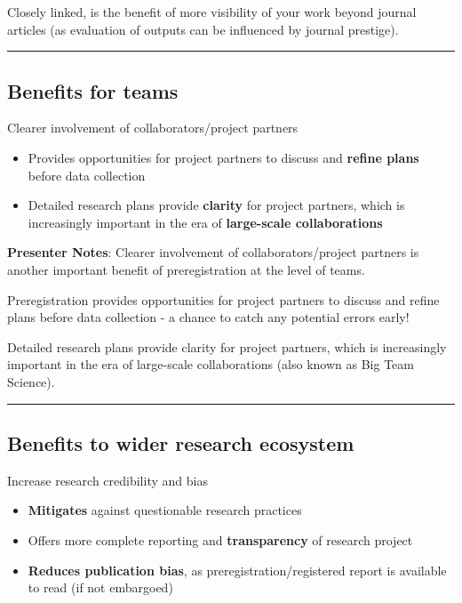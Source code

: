 \documentclass[
  letterpaper,
  DIV=11,
  numbers=noendperiod]{scrartcl}
\providecommand{\tightlist}{%
  \setlength{\itemsep}{0pt}\setlength{\parskip}{0pt}}
\begin{document}
Closely linked, is the benefit of more visibility of your work beyond
journal articles (as evaluation of outputs can be influenced by journal
prestige).

\begin{center}\rule{0.5\linewidth}{0.5pt}\end{center}

\subsection{Benefits for teams}\label{benefits-for-teams}

Clearer involvement of collaborators/project partners

\begin{itemize}
\tightlist
\item
  Provides opportunities for project partners to discuss and
  \textbf{refine plans} before data collection
\item
  Detailed research plans provide \textbf{clarity} for project partners,
  which is increasingly important in the era of \textbf{large-scale
  collaborations}
\end{itemize}

\textbf{Presenter Notes}: Clearer involvement of collaborators/project
partners is another important benefit of preregistration at the level of
teams.

Preregistration provides opportunities for project partners to discuss
and refine plans before data collection - a chance to catch any
potential errors early!

Detailed research plans provide clarity for project partners, which is
increasingly important in the era of large-scale collaborations (also
known as Big Team Science).

\begin{center}\rule{0.5\linewidth}{0.5pt}\end{center}

\subsection{Benefits to wider research
ecosystem}\label{benefits-to-wider-research-ecosystem}

Increase research credibility and bias

\begin{itemize}
\tightlist
\item
  \textbf{Mitigates} against questionable research practices
\item
  Offers more complete reporting and \textbf{transparency} of research
  project
\item
  \textbf{Reduces publication bias}, as preregistration/registered
  report is available to read (if not embargoed)
\end{itemize}
\end{document}
